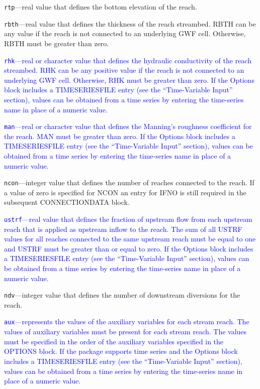 \begin{description}
\item \texttt{rtp}---real value that defines the bottom elevation of the reach.

\item \texttt{rbth}---real value that defines the thickness of the reach streambed. RBTH can be any value if the reach is not connected to an underlying GWF cell. Otherwise, RBTH must be greater than zero.

\item \textcolor{blue}{\texttt{rhk}---real or character value that defines the hydraulic conductivity of the reach streambed. RHK can be any positive value if the reach is not connected to an underlying GWF cell. Otherwise, RHK must be greater than zero. If the Options block includes a TIMESERIESFILE entry (see the ``Time-Variable Input'' section), values can be obtained from a time series by entering the time-series name in place of a numeric value.}

\item \textcolor{blue}{\texttt{man}---real or character value that defines the Manning's roughness coefficient for the reach. MAN must be greater than zero.  If the Options block includes a TIMESERIESFILE entry (see the ``Time-Variable Input'' section), values can be obtained from a time series by entering the time-series name in place of a numeric value.}

\item \texttt{ncon}---integer value that defines the number of reaches connected to the reach.  If a value of zero is specified for NCON an entry for IFNO is still required in the subsequent CONNECTIONDATA block.

\item \textcolor{blue}{\texttt{ustrf}---real value that defines the fraction of upstream flow from each upstream reach that is applied as upstream inflow to the reach. The sum of all USTRF values for all reaches connected to the same upstream reach must be equal to one and USTRF must be greater than or equal to zero. If the Options block includes a TIMESERIESFILE entry (see the ``Time-Variable Input'' section), values can be obtained from a time series by entering the time-series name in place of a numeric value.}

\item \texttt{ndv}---integer value that defines the number of downstream diversions for the reach.

\item \textcolor{blue}{\texttt{aux}---represents the values of the auxiliary variables for each stream reach. The values of auxiliary variables must be present for each stream reach. The values must be specified in the order of the auxiliary variables specified in the OPTIONS block.  If the package supports time series and the Options block includes a TIMESERIESFILE entry (see the ``Time-Variable Input'' section), values can be obtained from a time series by entering the time-series name in place of a numeric value.}


\end{description}
